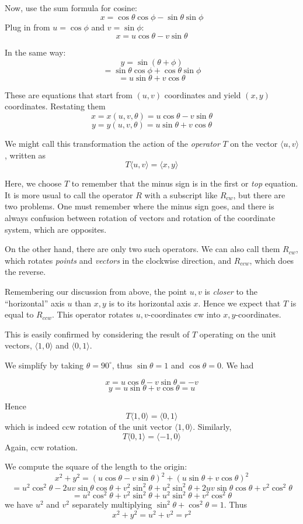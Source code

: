 \documentclass[11pt, oneside]{article}
\begin{document}
Now, use the sum formula for cosine: 
\[ x = \cos \theta \cos \phi - \sin \theta \sin \phi \]
Plug in from $u = \cos \phi$ and $v = \sin \phi$:
\[ x = u \cos \theta - v \sin \theta \]

In the same way:
\[ y = \sin (\theta + \phi) \]
\[ = \sin \theta \cos \phi + \cos \theta \sin \phi \]
\[ = u \sin \theta + v \cos \theta \]

These are equations that start from $(u,v)$ coordinates and yield $(x,y)$ coordinates.  Restating them
\[ x = x(u,v,\theta) = u \cos \theta - v \sin \theta \]
\[ y = y(u,v,\theta) = u \sin \theta + v \cos \theta \]

We might call this transformation the action of the \emph{operator} $T$ on the vector $\langle u,v \rangle$, written as
\[ T \langle u,v \rangle = \langle x,y \rangle \]

Here, we choose $T$ to remember that the minus sign is in the first or \emph{top} equation.  It is more usual to call the operator $R$ with a subscript like $R_{cw}$, but there are two problems.  One must remember where the minus sign goes, and there is always confusion between rotation of vectors and rotation of the coordinate system, which are opposites.

On the other hand, there are only two such operators.  We can also call them $R_{cw}$, which rotates \emph{points} and \emph{vectors} in the clockwise direction, and $R_{ccw}$, which does the reverse.  

Remembering our discussion from above, the point $u,v$ is \emph{closer} to the ``horizontal'' axis $u$ than $x,y$ is to its horizontal axis $x$.  Hence we expect that $T$ is equal to $R_{ccw}$.  This operator rotates $u,v$-coordinates cw into $x,y$-coordinates.

This is easily confirmed by considering the result of $T$ operating on the unit vectors, $\langle 1,0 \rangle$ and $\langle 0,1 \rangle$.

We simplify by taking $\theta = 90^{\circ}$, thus $\sin \theta = 1$ and $\cos \theta = 0$.  We had

\[ x = u \cos \theta - v \sin \theta = -v \]
\[ y = u \sin \theta + v \cos \theta = u \]

Hence
\[ T \langle 1,0 \rangle = \langle 0,1 \rangle \]
which is indeed ccw rotation of the unit vector $\langle 1,0 \rangle$.  Similarly, 
\[ T \langle 0,1 \rangle = \langle -1,0 \rangle \]
Again, ccw rotation.

We compute the square of the length to the origin:
\[ x^2 + y^2 = (u \cos \theta - v \sin \theta)^2 + (u \sin \theta + v \cos \theta)^2 \]
\[ = u^2 \cos^2 \theta - 2uv \sin \theta \cos \theta + v^2 \sin^2 \theta + u^2 \sin^2 \theta + 2uv \sin \theta \cos \theta + v^2 \cos^2 \theta \]
\[ = u^2 \cos^2 \theta + v^2 \sin^2 \theta + u^2 \sin^2 \theta  + v^2 \cos^2 \theta \]
we have $u^2$ and $v^2$ separately multiplying $\sin^2 \theta + \cos^2 \theta = 1$.  Thus
\[ x^2 + y^2 = u^2 + v^2 = r^2 \]
\end{document}
